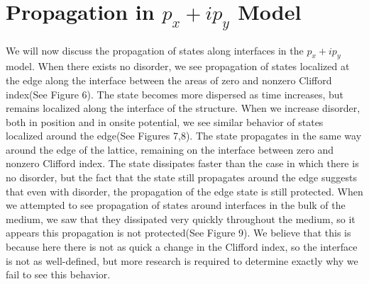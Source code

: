 \documentclass[a4paper]{article}
\begin{document}
\section{Propagation in \texorpdfstring{$p_x + ip_y$}{px + ipy} Model}

We will now discuss the propagation of states along interfaces in the {$p_x + ip_y$} model. When there exists no disorder, we see propagation of states localized at the edge along the interface between the areas of zero and nonzero Clifford index(See Figure 6). The state becomes more dispersed as time increases, but remains localized along the interface of the structure. When we increase disorder, both in position and in onsite potential, we see similar behavior of states localized around the edge(See Figures 7,8). The state propagates in the same way around the edge of the lattice, remaining on the interface between zero and nonzero Clifford index. The state dissipates faster than the case in which there is no disorder, but the fact that the state still propagates around the edge suggests that even with disorder, the propagation of the edge state is still protected. When we attempted to see propagation of states around interfaces in the bulk of the medium, we saw that they dissipated very quickly throughout the medium, so it appears this propagation is not protected(See Figure 9). We believe that this is because here there is not as quick a change in the Clifford index, so the interface is not as well-defined, but more research is required to determine exactly why we fail to see this behavior.
\end{document}
